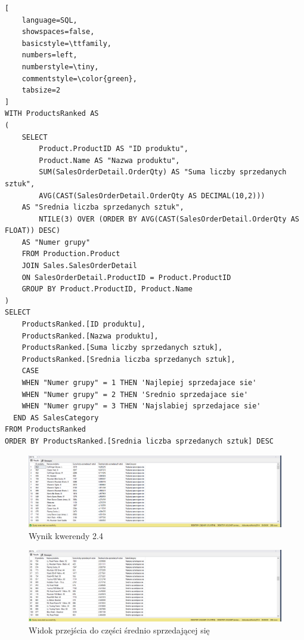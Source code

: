 \documentclass[a4paper,12pt]{article}
\begin{document}
{\small
\begin{lstlisting}[
	language=SQL,
	showspaces=false,
	basicstyle=\ttfamily,
	numbers=left,
	numberstyle=\tiny,
	commentstyle=\color{green},
	tabsize=2
]
WITH ProductsRanked AS 
(
	SELECT 
		Product.ProductID AS "ID produktu",
		Product.Name AS "Nazwa produktu",
		SUM(SalesOrderDetail.OrderQty) AS "Suma liczby sprzedanych sztuk",
		AVG(CAST(SalesOrderDetail.OrderQty AS DECIMAL(10,2))) 
    AS "Srednia liczba sprzedanych sztuk",
		NTILE(3) OVER (ORDER BY AVG(CAST(SalesOrderDetail.OrderQty AS FLOAT)) DESC) 
    AS "Numer grupy"
	FROM Production.Product
	JOIN Sales.SalesOrderDetail 
    ON SalesOrderDetail.ProductID = Product.ProductID
	GROUP BY Product.ProductID, Product.Name
)
SELECT 
	ProductsRanked.[ID produktu],
	ProductsRanked.[Nazwa produktu],
	ProductsRanked.[Suma liczby sprzedanych sztuk],
	ProductsRanked.[Srednia liczba sprzedanych sztuk],
	CASE 
    WHEN "Numer grupy" = 1 THEN 'Najlepiej sprzedajace sie'
    WHEN "Numer grupy" = 2 THEN 'Srednio sprzedajace sie'
    WHEN "Numer grupy" = 3 THEN 'Najslabiej sprzedajace sie'
  END AS SalesCategory
FROM ProductsRanked
ORDER BY ProductsRanked.[Srednia liczba sprzedanych sztuk] DESC
\end{lstlisting}}

\begin{figure}[H]
  \centering
  \includegraphics[width=1.0\textwidth]{images/2.4.png}
  \caption{Wynik kwerendy 2.4}
\end{figure}

\begin{figure}[H]
  \centering
  \includegraphics[width=1.0\textwidth]{images/2.4_avg_selling.png}
  \caption{Widok przejścia do części średnio sprzedającej się}
\end{figure}
\end{document}
